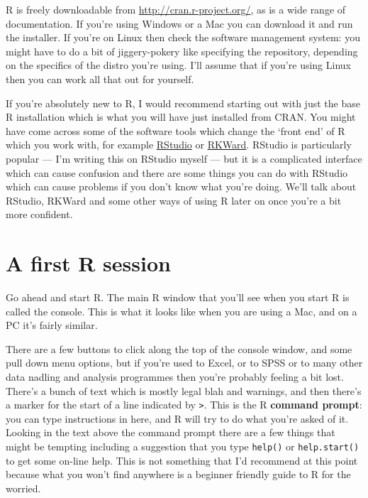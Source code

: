 \documentclass[
]{book}
\begin{document}
R is freely downloadable from \url{http://cran.r-project.org/}, as is a wide range of documentation. If you're using Windows or a Mac you can download it and run the installer. If you're on Linux then check the software management system: you might have to do a bit of jiggery-pokery like specifying the repository, depending on the specifics of the distro you're using. I'll assume that if you're using Linux then you can work all that out for yourself.

If you're absolutely new to R, I would recommend starting out with just the base R installation which is what you will have just installed from CRAN. You might have come across some of the software tools which change the `front end' of R which you work with, for example \href{https://www.rstudio.com/}{RStudio} or \href{https://rkward.kde.org/}{RKWard}. RStudio is particularly popular --- I'm writing this on RStudio myself --- but it is a complicated interface which can cause confusion and there are some things you can do with RStudio which can cause problems if you don't know what you're doing. We'll talk about RStudio, RKWard and some other ways of using R later on once you're a bit more confident.

\hypertarget{a-first-r-session-1}{%
\section{A first R session}\label{a-first-r-session-1}}

Go ahead and start R. The main R window that you'll see when you start R is called the console. This is what it looks like when you are using a Mac, and on a PC it's fairly similar.

There are a few buttons to click along the top of the console window, and some pull down menu options, but if you're used to Excel, or to SPSS or to many other data nadling and analysis programmes then you're probably feeling a bit lost. There's a bunch of text which is mostly legal blah and warnings, and then there's a marker for the start of a line indicated by \texttt{\textgreater{}}. This is the R \textbf{command prompt}: you can type instructions in here, and R will try to do what you're asked of it. Looking in the text above the command prompt there are a few things that might be tempting including a suggestion that you type \texttt{help()} or \texttt{help.start()} to get some on-line help. This is not something that I'd recommend at this point because what you won't find anywhere is a beginner friendly guide to R for the worried.
\end{document}

